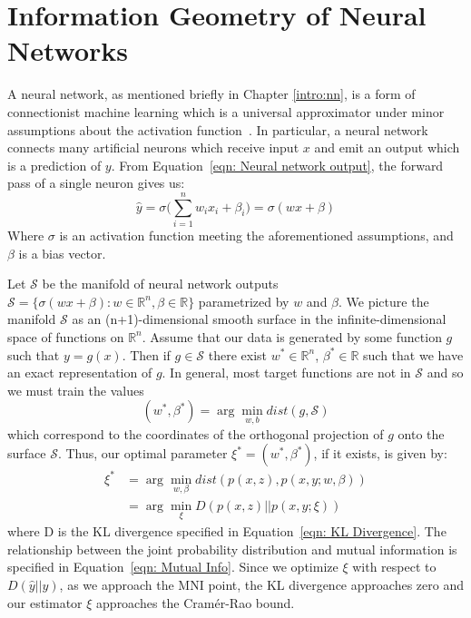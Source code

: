 \section{Information Geometry of Neural Networks}
A neural network, as mentioned briefly in Chapter \ref{intro:nn}, is a form of connectionist machine learning which is a universal approximator under minor assumptions about the activation function~\cite{goodfellow2016deep}.
In particular, a neural network connects many artificial neurons which receive input $x$ and emit an output which is a prediction of $y$. 
From Equation~\ref{eqn: Neural network output}, the forward pass of a single neuron gives us:
\begin{equation}
\hat{y} = \sigma\bigg(\sum_{i=1}^{n}w_i x_i + \beta_{i} \bigg) = \sigma(w x + \beta)	
\end{equation}
Where $\sigma$ is an activation function meeting the aforementioned assumptions, and $\beta$ is a bias vector.

Let $\mathcal{S}$ be the manifold of neural network outputs $\mathcal{S} = \{\sigma(w x + \beta) : w \in \mathbb{R}^n, \beta \in \mathbb{R}\}$ parametrized by $w$ and $\beta$. 
We picture the manifold $\mathcal{S}$ as an (n+1)-dimensional smooth surface in the infinite-dimensional space of functions on $\mathbb{R}^n$. 
Assume that our data is generated by some function $g$ such that $y = g(x)$. 
Then if $g \in \mathcal{S}$ there exist $w^* \in \mathbb{R}^n$, $\beta^* \in \mathbb{R}$ such that we have an exact representation of $g$.
In general, most target functions are not in $\mathcal{S}$ and so we must train the values
\begin{equation}
	(w^*, \beta^*) = \arg \min_{w, b} dist(g, \mathcal{S})
\end{equation}
which correspond to the coordinates of the orthogonal projection of $g$ onto the surface $\mathcal{S}$.
Thus, our optimal parameter $\xi^* = (w^*, \beta^*)$, if it exists, is given by:
\begin{align} \label{eqn:optimal_xi}
	\xi^* &= \arg \min_{w, \beta} dist(p(x, z), p(x, y; w, \beta)) \\ 
	&= \arg \min_{\xi} D(p(x, z) || p(x, y; \xi))
\end{align}
\noindent where D is the KL divergence specified in Equation~\ref{eqn: KL Divergence}.
The relationship between the joint probability distribution and mutual information is specified in Equation~\ref{eqn: Mutual Info}.
Since we optimize $\xi$ with respect to $D(\hat{y}||{y})$, as we approach the MNI point, the KL divergence approaches zero and our estimator $\xi$ approaches the Cram\'{e}r-Rao bound.

